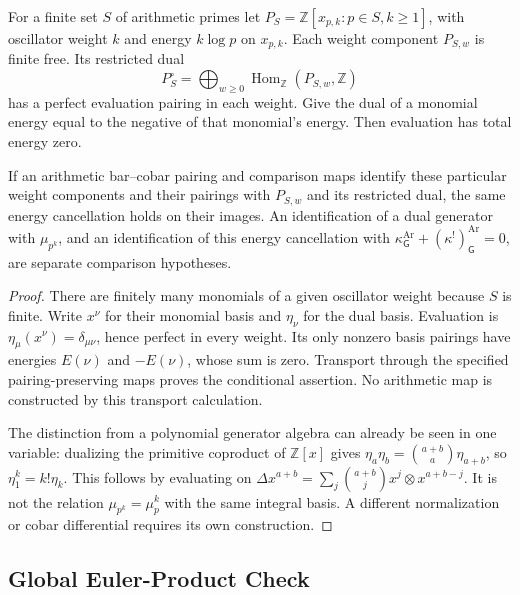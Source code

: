 \begin{theorem}
\label{v4-arith:pos:thm:weight-comp}
For a finite set \(S\) of arithmetic primes let
\(P_S=\mathbb Z[x_{p,k}:p\in S,k\ge1]\), with oscillator weight
\(k\) and energy \(k\log p\) on \(x_{p,k}\).
Each weight component \(P_{S,w}\) is finite free. Its restricted dual
\[
 P_S^\circ=\bigoplus_{w\ge0}\operatorname{Hom}_{\mathbb Z}
                              (P_{S,w},\mathbb Z)
\]
has a perfect evaluation pairing in each weight. Give the dual of a
monomial energy equal to the negative of that monomial's energy.
Then evaluation has total energy zero.

If an arithmetic bar--cobar pairing and comparison maps identify these
particular weight components and their pairings with \(P_{S,w}\) and
its restricted dual, the same energy cancellation holds on their images.
An identification of a dual generator with \(\mu_{p^k}\), and an
identification of this energy cancellation with
\(\kappa^{\mathrm{Ar}}_{\mathsf G}+(\kappa^!)^{\mathrm{Ar}}_{\mathsf G}=0\),
are separate comparison hypotheses.
\end{theorem}
\begin{proof}
There are finitely many monomials of a given oscillator weight because
\(S\) is finite. Write \(x^\nu\) for their monomial basis and
\(\eta_\nu\) for the dual basis. Evaluation is
\(\eta_\mu(x^\nu)=\delta_{\mu\nu}\), hence perfect in every weight.
Its only nonzero basis pairings have energies
\(E(\nu)\) and \(-E(\nu)\), whose sum is zero. Transport through the
specified pairing-preserving maps proves the conditional assertion.
No arithmetic map is constructed by this transport calculation.

The distinction from a polynomial generator algebra can already be seen
in one variable: dualizing the primitive coproduct of \(\mathbb Z[x]\)
gives \(\eta_a\eta_b=\binom{a+b}{a}\eta_{a+b}\), so
\(\eta_1^k=k!\eta_k\). This follows by evaluating on
\(\Delta x^{a+b}=\sum_j\binom{a+b}{j}x^j\otimes x^{a+b-j}\).
It is not the relation \(\mu_{p^k}=\mu_p^k\) with the same integral
basis. A different normalization or cobar differential requires its own
construction.
\end{proof}

\subsection{Global Euler-Product Check}
\label{v4-arith:pos:euler-check}


